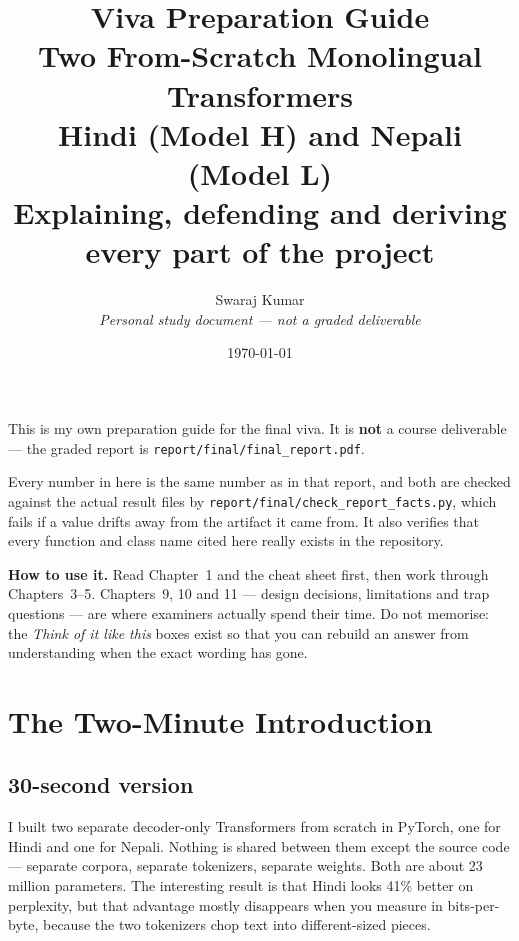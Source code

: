 \documentclass[11pt]{report}
\title{\Huge\textbf{Viva Preparation Guide}\\[0.3cm]
\Large Two From-Scratch Monolingual Transformers\\[0.1cm]
\Large Hindi (Model H) and Nepali (Model L)\\[0.3cm]
\large Explaining, defending and deriving every part of the project}
\author{Swaraj Kumar\\[0.2cm]
\small \textit{Personal study document --- not a graded deliverable}}
\date{\today}
\begin{document}
\maketitle

\begin{tcolorbox}[colback=gray!8,colframe=gray!50!black,
  title={\textbf{What this document is, and how to use it}}]
This is my own preparation guide for the final viva. It is \textbf{not} a
course deliverable --- the graded report is
\texttt{report/final/final\_report.pdf}.

Every number in here is the same number as in that report, and both are
checked against the actual result files by
\texttt{report/final/check\_report\_facts.py}, which fails if a value drifts
away from the artifact it came from. It also verifies that every function and
class name cited here really exists in the repository.

\medskip
\textbf{How to use it.} Read Chapter~1 and the cheat sheet first, then work
through Chapters~3--5. Chapters~9, 10 and 11 --- design decisions, limitations
and trap questions --- are where examiners actually spend their time. Do not
memorise: the \emph{Think of it like this} boxes exist so that you can rebuild
an answer from understanding when the exact wording has gone.
\end{tcolorbox}

\tableofcontents

\chapter{The Two-Minute Introduction}

\section{30-second version}

\begin{sayit}
I built two separate decoder-only Transformers from scratch in PyTorch, one
for Hindi and one for Nepali. Nothing is shared between them except the source
code --- separate corpora, separate tokenizers, separate weights. Both are
about 23 million parameters. The interesting result is that Hindi looks 41\%
better on perplexity, but that advantage mostly disappears when you measure in
bits-per-byte, because the two tokenizers chop text into different-sized
pieces.
\end{sayit}
\end{document}
